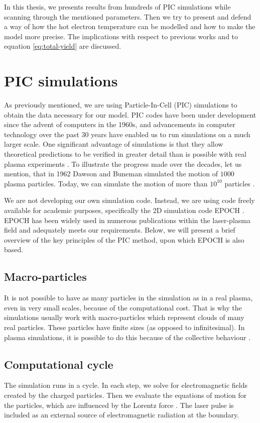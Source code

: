 In this thesis, we presents results from hundreds of PIC simulations while scanning through the mentioned parameters. Then we try to present and  defend a way of how the hot electron temperature can be modelled and how to make the model more precise. The implications with respect to previous works and to equation \ref{eq:total-yield} are discussed.

\section{PIC simulations}
As previously mentioned, we are using Particle-In-Cell (PIC) simulations to obtain the data necessary for our model. PIC codes have been under development since the advent of computers in the 1960s, and advancements in computer technology over the past 30 years have enabled us to run simulations on a much larger scale. One significant advantage of simulations is that they allow theoretical predictions to be verified in greater detail than is possible with real plasma experiments \cite{dawson1962}. To illustrate the progress made over the decades, let us mention, that in 1962 Dawson and Buneman simulated the motion of $1000$ plasma particles. Today, we can simulate the motion of more than $10^{10}$ particles \cite{tskhakaya2007}.

We are not developing our own simulation code. Instead, we are using code freely available for academic purposes, specifically the 2D simulation code EPOCH \cite{arber2015}. EPOCH has been widely used in numerous publications within the laser-plasma field and adequately meets our requirements. Below, we will present a brief overview of the key principles of the PIC method, upon which EPOCH is also based.

\subsection*{Macro-particles}
It is not possible to have as many particles in the simulation as in a real plasma, even in very small scales, because of the computational cost. That is why the simulations usually work with macro-particles which represent clouds of many real particles. These particles have finite sizes (as opposed to infinitesimal). In plasma simulations, it is possible to do this because of the collective behaviour \cite{fonseca2009} .

\subsection*{Computational cycle}
The simulation runs in a cycle. In each step, we solve for electromagnetic fields created by the charged particles. Then we evaluate the equations of motion for the particles, which are influenced by the Lorentz force \cite{birdsall1985}. The laser pulse is included as an external source of electromagnetic radiation at the boundary.

